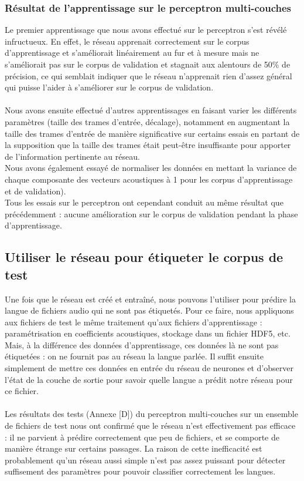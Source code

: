 \documentclass{article}
\begin{document}
\subsubsection{Résultat de l'apprentissage sur le perceptron multi-couches}

Le premier apprentissage que nous avons effectué sur le perceptron s'est révélé infructueux. En effet, le réseau apprenait correctement sur le corpus d'apprentissage et s'améliorait linéairement au fur et à mesure mais ne s'améliorait pas sur le corpus de validation et stagnait aux alentours de 50\% de précision, ce qui semblait indiquer que le réseau n'apprenait rien d'assez général qui puisse l'aider à s'améliorer sur le corpus de validation.\\
 \\
Nous avons ensuite effectué d'autres apprentissages en faisant varier les différents paramètres (taille des trames d'entrée, décalage), notamment en augmentant la taille des trames d'entrée de manière significative sur certains essais en partant de la supposition que la taille des trames était peut-être insuffisante pour apporter de l'information pertinente au réseau.\\
\noindent Nous avons également essayé de normaliser les données en mettant la variance de chaque composante des vecteurs acoustiques à 1 pour les corpus d'apprentissage et de validation).\\
\noindent Tous les essais sur le perceptron ont cependant conduit au même résultat que précédemment : aucune amélioration sur le corpus de validation pendant la phase d'apprentissage.

\subsection{Utiliser le réseau pour étiqueter le corpus de test}

Une fois que le réseau est créé et entraîné, nous pouvons l'utiliser pour prédire la langue de fichiers audio qui ne sont pas étiquetés. Pour ce faire, nous appliquons aux fichiers de test le même traitement qu'aux fichiers d'apprentissage : paramétrisation en coefficients acoustiques, stockage dans un fichier HDF5, etc. Mais, à la différence des données d'apprentissage, ces données là ne sont pas étiquetées : on ne fournit pas au réseau la langue parlée. Il suffit ensuite simplement de mettre ces données en entrée du réseau de neurones et d'observer l'état de la couche de sortie pour savoir quelle langue a prédit notre réseau pour ce fichier.\\
 \\
Les résultats des tests (Annexe [D]) du perceptron multi-couches sur un ensemble de fichiers de test nous ont confirmé que le réseau n'est effectivement pas efficace : il ne parvient à prédire correctement que peu de fichiers, et se comporte de manière étrange sur certains passages. La raison de cette inefficacité est probablement qu'un réseau aussi simple n'est pas assez puissant pour détecter suffisement des paramètres pour pouvoir classifier correctement les langues.\\
\end{document}
